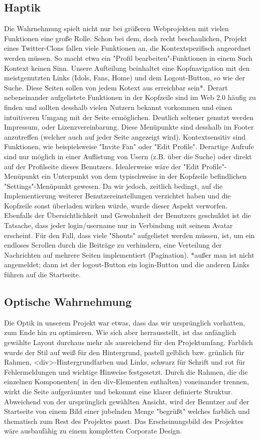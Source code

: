 \documentclass[12pt,a4paper]{article}
\begin{document}
\subsection{Haptik}
Die Wahrnehmung spielt nicht nur bei größeren Webprojekten mit vielen Funktionen eine große Rolle. Schon bei dem, doch recht beschaulichen, Projekt eines Twitter-Clons fallen viele Funktionen an, die Kontextspezifisch angeordnet werden müssen. So macht etwa ein "Profil bearbeiten"-Funktionen in einem Such Kontext keinen Sinn. Unsere Aufteilung beinhaltet eine Kopfnavigation mit den meistgenutzten Links (Idols, Fans, Home) und dem Logout-Button, so wie der Suche. Diese Seiten sollen von jedem Kotext aus erreichbar sein*. Derart nebeneinander aufgelistete Funktionen in der Kopfzeile sind im Web 2.0 häufig zu finden und sollten desshalb vielen Nutzern bekannt vorkommen und einen intuitiveren Umgang mit der Seite ermöglichen. Deutlich seltener genutzt werden Impressum, oder Lizenzvereinbarung. Diese Menüpunkte sind desshalb im Footer anzutreffen (welcher auch auf jeder Seite angezeigt wird). Kontextsensitiv sind Funktionen, wie beispielsweise "Invite Fan" oder "Edit Profile". Derartige Aufrufe sind nur möglich in einer
 Auflistung von Usern (z.B. über die Suche) oder direkt auf der Profilseite dieses Benutzers. Idealerweise wäre der "Edit Profile"-Menüpunkt ein Unterpunkt von dem typischweise in der Kopfzeile befindlichen "Settings"-Menüpunkt  gewesen. Da wir jedoch, zeitlich bedingt, auf die Implementierung weiterer Benutzereinstellungen verzichtet haben und die Kopfzeile sonst überladen wirken würde, wurde dieser Aspekt verworfen. Ebenfalls der Übersichtlichkeit und Gewohnheit der Benutzers geschuldet ist die Tatsache, dass jeder login/username nur in Verbindung mit seinem Avatar erscheint. Für den Fall, dass viele "Shouts" aufgelistet werden müssen, ist, um ein endloses Scrollen durch die Beiträge zu verhindern, eine Verteilung der Nachrichten auf mehrere Seiten implementiert (Pagination).  
*außer man ist nicht angemeldet; dann ist der logout-Button ein login-Button und die anderen Links führen auf die Startseite.

\subsection{Optische Wahrnehmung}
Die Optik in unserem Projekt war etwas, dass das wir ursprünglich vorhatten, zum Ende hin zu optimieren. Wie sich aber herrausstellt, ist das anfänglich gewählte Layout durchaus mehr als ausreichend für den Projektumfang. Farblich wurde der Stil auf weiß für den Hintergrund, pastell gelblich bzw. grünlich für Rahmen, <div>-Hintergrundfarben und Links, schwarz für Schrift und rot für Fehlermeldungen und wichtige Hinweise festgesetzt. Durch die Rahmen, die die einzelnen Komponenten( in den div-Elementen enthalten) voneinander trennen, wirkt die Seite aufgeräumter und bekommt eine klarer definierte Struktur. Abweichend von der ursprünglich gewählten Ansicht, wird der Benutzer auf der Startseite von einem Bild einer jubelnden Menge "begrüßt" welches farblich und thematisch zum Rest des Projektes passt. Das Erscheinungsbild des Projektes wäre ausbaufähig zu einem kompletten Corporate Design.
\end{document}
